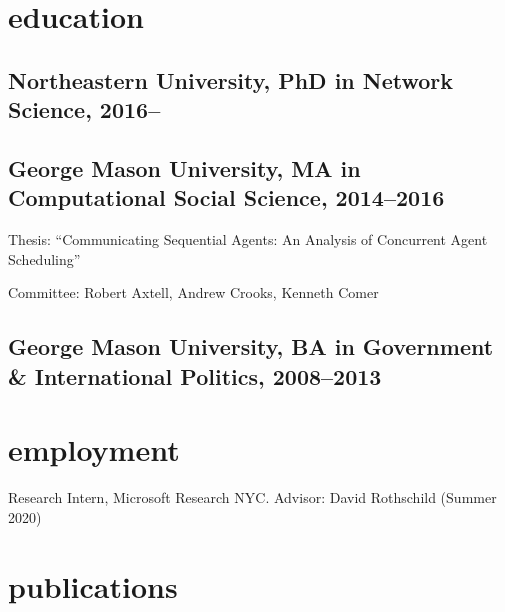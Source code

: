 \documentclass[11pt, letter]{article}
\title{}
\begin{document}
\maketitle

%

\section{education}
\subsection{Northeastern University, PhD in Network Science, 2016--}
\subsection{George Mason University, MA in Computational Social Science, 2014--2016}
Thesis: ``Communicating Sequential Agents: An Analysis of Concurrent Agent Scheduling''

Committee: Robert Axtell, Andrew Crooks, Kenneth Comer
\subsection{George Mason University, BA in Government \& International Politics, 2008--2013}
\vspace{2mm}
 \section{employment}
 Research Intern, Microsoft Research NYC. Advisor: David Rothschild (Summer 2020)
\vspace{-1mm}

\section{publications}
\end{document}
